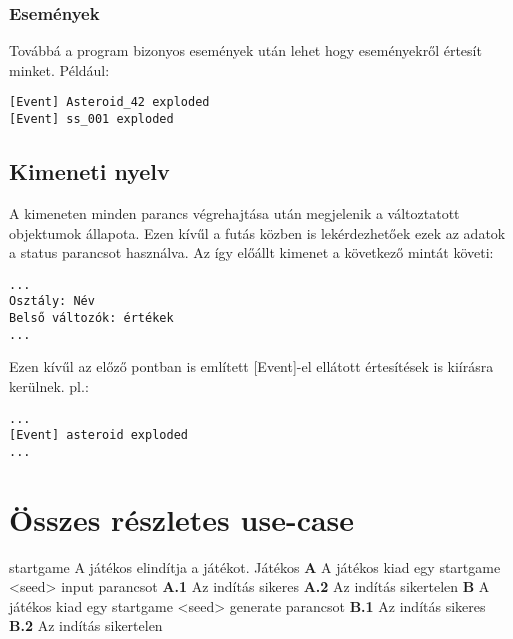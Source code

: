 \documentclass[../../projlab]{subfiles}
\begin{document}
\subsubsection{Események}
Továbbá a program bizonyos események után lehet hogy eseményekről értesít minket.
Például:
\begin{verbatim}
[Event] Asteroid_42 exploded
[Event] ss_001 exploded
\end{verbatim}


\subsection{Kimeneti nyelv}

A kimeneten minden parancs végrehajtása után megjelenik a változtatott objektumok állapota. Ezen kívűl a futás közben is lekérdezhetőek ezek az adatok a status parancsot használva.
Az így előállt kimenet a következő mintát követi:
\begin{verbatim}
...
Osztály: Név
Belső változók: értékek
...
\end{verbatim}

Ezen kívűl az előző pontban is említett [Event]-el ellátott értesítések is kiírásra kerülnek.
pl.:
\begin{verbatim}
...
[Event] asteroid exploded
...
\end{verbatim}



\section{Összes részletes use-case}
\begin{use-case}
    {startgame}
    {A játékos elindítja a játékot.}
    {Játékos} 
    \textbf{A} A játékos kiad egy startgame <seed> input parancsot\newline
    \textbf{A.1} Az indítás sikeres \newline
    \textbf{A.2} Az indítás sikertelen \newline
    \textbf{B} A játékos kiad egy startgame <seed> generate parancsot\newline
	\textbf{B.1} Az indítás sikeres \newline
    \textbf{B.2} Az indítás sikertelen 

\end{use-case}
\end{document}
